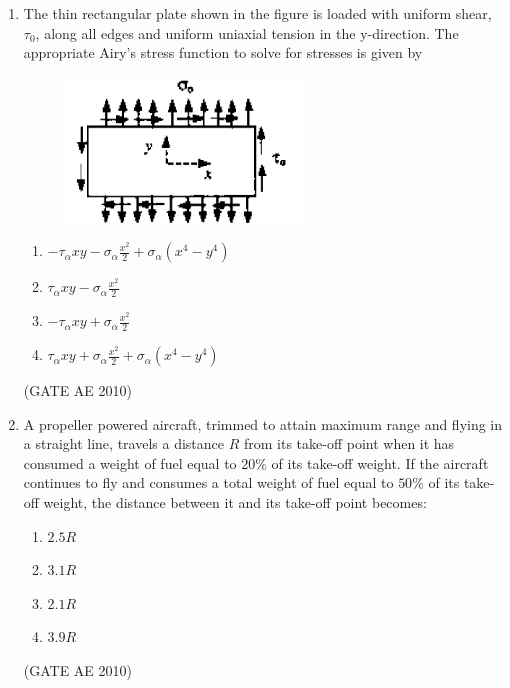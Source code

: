 \documentclass[journal]{IEEEtran}
\begin{document}
\begin{enumerate}
\item The thin rectangular plate shown in the figure is loaded with uniform shear, $\tau_0$, along all edges and uniform uniaxial tension in the y-direction. The appropriate Airy's stress function to solve for stresses is given by
\begin{figure}[H]
    \centering
    \includegraphics[width=0.6\textwidth]{5.png}
    \caption{}
    \label{fig:question29}
\end{figure}

\begin{multicols}{2}
\begin{enumerate}
\item $-\tau_{\alpha}xy - \sigma_{\alpha}\frac{x^2}{2} + \sigma_{\alpha}(x^4 - y^4)$
\item $\tau_{\alpha}xy - \sigma_{\alpha}\frac{x^2}{2}$
\item $-\tau_{\alpha}xy + \sigma_{\alpha}\frac{x^2}{2}$
\item $\tau_{\alpha}xy + \sigma_{\alpha}\frac{x^2}{2} + \sigma_{\alpha}(x^4 - y^4)$
\end{enumerate}
\end{multicols}
\hfill (GATE AE 2010)

\item A propeller powered aircraft, trimmed to attain maximum range and flying in a straight line, travels a distance $R$ from its take-off point when it has consumed a weight of fuel equal to $20\%$ of its take-off weight. If the aircraft continues to fly and consumes a total weight of fuel equal to $50\%$ of its take-off weight, the distance between it and its take-off point becomes:

\begin{multicols}{4}
\begin{enumerate}
\item $2.5R$  
\item $3.1R$  
\item $2.1R$  
\item $3.9R$  
\end{enumerate}
\end{multicols}
\hfill (GATE AE 2010)


\end{enumerate}
\end{document}
